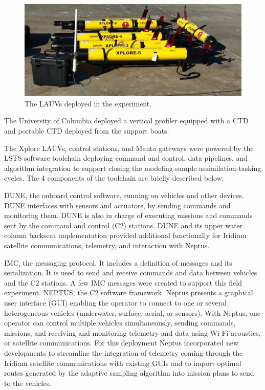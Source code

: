 \begin{figure}
    \centering
    \includegraphics[width=.7\linewidth]{fig/lauvs.png}
    \caption{The LAUVs deployed in the experiment.}
    \label{fig:lauvs}
\end{figure}


The University of Columbia deployed a vertical profiler equipped with a CTD and portable CTD deployed from the support boats.

The Xplore LAUVs, control stations, and Manta gateways were powered by the LSTS software toolchain \cite{pinto2013lsts} deploying command and control, data pipelines, and algorithm integration to support closing the modeling-sample-assimilation-tasking cycles. The 4 components of the toolchain are briefly described below:

DUNE, the onboard control software, running on vehicles and other devices. DUNE interfaces with sensors and actuators, by sending commands and monitoring them. DUNE is also in charge of executing missions and commands sent by the command and control (C2) stations. DUNE and its upper water column backseat implementation provided additional functionally for Iridium satellite communications, telemetry, and interaction with Neptus. 

IMC, the messaging protocol. It includes a definition of messages and its serialization. It is used to send and receive commands and data between vehicles and the C2 stations. A few IMC messages were created to support this field experiment.
NEPTUS, the C2 software framework. Neptus presents a graphical user interface (GUI) enabling the operator to connect to one or several heterogeneous vehicles (underwater, surface, aerial, or sensors). With Neptus, one operator can control multiple vehicles simultaneously, sending commands, missions, and receiving and monitoring telemetry and data using Wi-Fi acoustics, or satellite communications. For this deployment Neptus incorporated new developments to streamline the integration of telemetry coming through the Iridium satellite communications with existing GUIs and to import optimal routes generated by the adaptive sampling algorithm into mission plans to send to the vehicles. 

